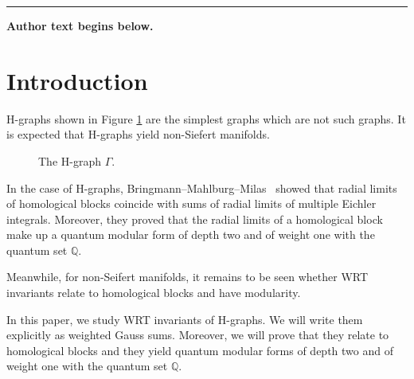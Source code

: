 \documentclass[11pt]{article}
\numberwithin{equation}{section}
\numberwithin{equation}{section}
\begin{document}
\medskip\hrule\medskip\noindent\textbf{Author text begins below.}\par
\setcounter{section}{0}
\section{Introduction} \label{sec:intro}

\setcounter{section}{1}\setcounter{equation}{0}
H-graphs shown in Figure \ref{fig:H-graph} are the simplest graphs which are not such graphs.
It is expected that H-graphs yield non-Siefert manifolds.
\begin{figure}[h]	\centering
		\caption{The H-graph $ \Gamma $.}\label{fig:H-graph}
	\end{figure}

In the case of H-graphs, Bringmann--Mahlburg--Milas~\cite{BMM} showed that radial limits of homological blocks coincide with sums of radial limits of multiple Eichler integrals.
Moreover, they proved that the radial limits of a homological block make up a quantum modular form of depth two and of weight one with the quantum set $ \mathbb{Q} $.

Meanwhile, for non-Seifert manifolds, it remains to be seen whether WRT invariants relate to homological blocks \cite[Conjecture~2.1]{GPPV} and have modularity.

In this paper, we study WRT invariants of H-graphs.
We will write them explicitly as weighted Gauss sums.
Moreover, we will prove that they relate to homological blocks and they yield quantum modular forms of depth two and of weight one with the quantum set $ \mathbb{Q} $.
\end{document}
